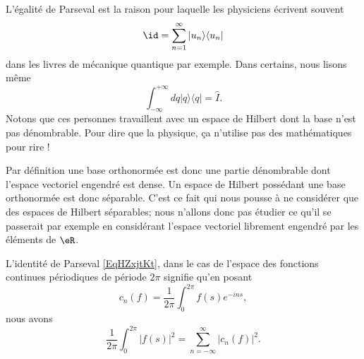 \begin{remark}
	L'égalité de Parseval est la raison pour laquelle les physiciens écrivent souvent
	\begin{equation}
		\id=\sum_{n=1}^{\infty}|u_n\rangle\langle u_n|
	\end{equation}
	dans les livres de mécanique quantique par exemple. Dans certains\cite{SchomblondQEDQCD}, nous lisons même
	\begin{equation}
		\int_{-\infty}^{+\infty}dq|q\rangle\langle q| =\hat I.
	\end{equation}
	Notons que ces personnes travaillent avec un espace de Hilbert dont la base n'est pas dénombrable. Pour dire que la physique, ça n'utilise pas des mathématiques pour rire !
\end{remark}

\begin{remark}
	Par définition une base orthonormée est donc une partie dénombrable dont l'espace vectoriel engendré est dense. Un espace de Hilbert possédant une base orthonormée est donc séparable. C'est ce fait qui nous pousse à ne considérer que des espaces de Hilbert séparables; nous n'allons donc pas étudier ce qu'il se passerait par exemple en considérant l'espace vectoriel librement engendré par les éléments de \( \eR\).
\end{remark}

\begin{example}
	L'identité de Parseval \eqref{EqHZxjtKt}, dans le cas de l'espace des fonctions continues périodiques de période \( 2\pi\) signifie qu'en posant
	\begin{equation}
		c_n(f)=\frac{1}{ 2\pi }\int_0^{2\pi}f(s) e^{-ins},
	\end{equation}
	nous avons
	\begin{equation}    \label{EqMIuCSfz}
		\frac{1}{ 2\pi }\int_0^{2\pi}| f(s) |^2=\sum_{n=-\infty}^{\infty}| c_n(f) |^2.
	\end{equation}
\end{example}

